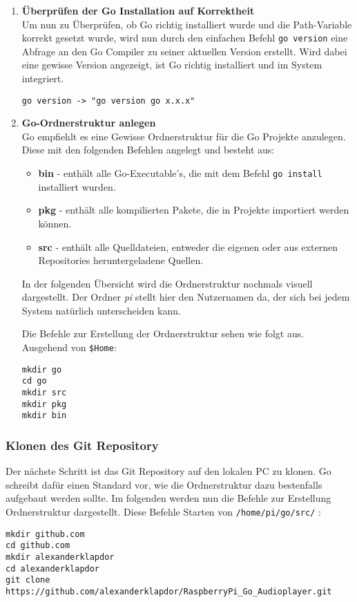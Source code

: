 \begin{enumerate}
\item \textbf{Überprüfen der Go Installation auf Korrektheit} \\
Um nun zu Überprüfen, ob Go richtig installiert wurde und die Path-Variable korrekt gesetzt wurde, wird nun durch den einfachen Befehl \verb|go version| eine Abfrage an den Go Compiler zu seiner aktuellen Version erstellt. Wird dabei eine gewisse Version angezeigt, ist Go richtig installiert und im System integriert.
\begin{lstlisting}
go version -> "go version go x.x.x"
\end{lstlisting}

\item \textbf{Go-Ordnerstruktur anlegen} \\
Go empfiehlt es eine Gewisse Ordnerstruktur für die Go Projekte anzulegen. Diese mit den folgenden Befehlen angelegt und besteht aus:
\begin{itemize}
\item \textbf{bin} - enthält alle Go-Executable's, die mit dem Befehl \verb|go install| installiert wurden.
\item \textbf{pkg} - enthält alle kompilierten Pakete, die in Projekte importiert werden können. 
\item \textbf{src} - enthält alle Quelldateien, entweder die eigenen oder aus externen Repositories heruntergeladene Quellen.
\end{itemize}
In der folgenden Übersicht wird die Ordnerstruktur nochmals visuell dargestellt.
Der Ordner \textit{pi} stellt hier den Nutzernamen da, der sich bei jedem System natürlich unterscheiden kann. \\
\begin{minipage}[t]{\textwidth}
Die Befehle zur Erstellung der Ordnerstruktur sehen wie folgt aus. \\
Ausgehend von \verb|$Home|:
\begin{lstlisting}[caption={Erstellung der Go Ordnerstruktur}]
mkdir go
cd go
mkdir src
mkdir pkg
mkdir bin
\end{lstlisting}
\end{minipage}


\end{enumerate}

\subsubsection{Klonen des Git Repository}
Der nächste Schritt ist das Git Repository auf den lokalen PC zu klonen. Go schreibt dafür einen Standard vor, wie die Ordnerstruktur dazu bestenfalls aufgebaut werden sollte. Im folgenden werden nun die Befehle zur Erstellung Ordnerstruktur dargestellt. 
Diese Befehle Starten von \verb|/home/pi/go/src/| :
\begin{lstlisting}[caption={Klonen des Git Repository}]
mkdir github.com 
cd github.com
mkdir alexanderklapdor
cd alexanderklapdor
git clone https://github.com/alexanderklapdor/RaspberryPi_Go_Audioplayer.git
\end{lstlisting}

